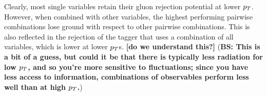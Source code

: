 Clearly, most single variables retain their gluon rejection potential at lower $p_T$. However, when combined
with other variables, the highest performing pairwise combinations lose ground with respect to other pairwise 
combinations. This is also reflected in the rejection of the tagger that uses a combination of all variables, which
is lower at lower $p_T$s. {\bf [do we understand this?]} ({\bf BS: This is a bit of a guess, but could it be that there is typically less radiation for low $p_T$, and so you're more sensitive to fluctuations; since you have less access to information, combinations of observables perform less well than at high $p_T$.})



